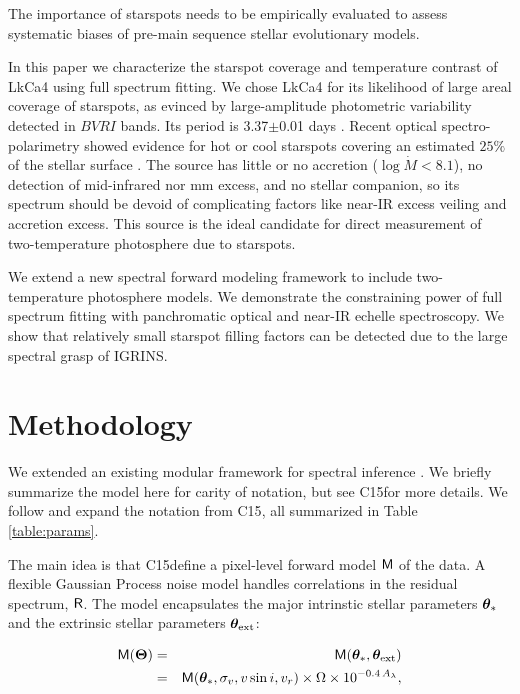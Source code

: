 \documentclass[onecolumn]{emulateapj}%
\newcommand{\iancze}{{\sc C15}}
\newcommand{\name}{LkCa4 }
\begin{document}
The importance of starspots needs to be empirically evaluated to assess systematic biases of pre-main sequence stellar evolutionary models.

In this paper we characterize the starspot coverage and temperature contrast of \name using full spectrum fitting.  We chose \name for its likelihood of large areal coverage of starspots, as evinced by large-amplitude photometric variability  detected in $BVRI$ bands.  Its period is 3.37$\pm$0.01 days \citep{1993AJ....106.1608V,1994IBVS.4042....1G}.  Recent optical spectro-polarimetry showed evidence for hot or cool starspots covering an estimated $25\%$ of the stellar surface \citep{2014MNRAS.444.3220D}.  The source has little or no accretion ($\log{\dot M} < 8.1$), no detection of mid-infrared nor mm excess, and no stellar companion, so its spectrum should be devoid of complicating factors like near-IR excess veiling and accretion excess.  This source is the ideal candidate for direct measurement of two-temperature photosphere due to starspots.

We extend a new spectral forward modeling framework to include two-temperature photosphere models.  We demonstrate the constraining power of full spectrum fitting with panchromatic optical and near-IR echelle spectroscopy.  We show that relatively small starspot filling factors can be detected due to the large spectral grasp of IGRINS.  

\section{Methodology}\label{sec:methods} 
We extended an existing modular framework for spectral inference \citep[][hereafter \iancze]{2015ApJ...812..128C}.  We briefly summarize the model here for carity of notation, but see \iancze for more details.  We follow and expand the notation from \iancze, all summarized in Table \ref{table:params}. 

The main idea is that \iancze define a pixel-level forward model $\mathsf{M}$ of the data.  A flexible Gaussian Process noise model handles correlations in the residual spectrum, $\mathsf{R}$.  The model encapsulates the major intrinstic stellar parameters ${\bm \theta}_{\ast}$ and the extrinsic stellar parameters ${\bm \theta}_{\rm ext}$:

\begin{eqnarray} \label{eqn:scaling}
\mathsf{M}({\bm \Theta}) &=& \mathsf{M}({\bm \theta}_{\ast}, {\bm \theta}_{\rm ext}) \\
         &=& \mathsf{M}({\bm \theta}_{\ast}, \sigma_v, v\sin{i}, v_r) \times \Omega \times 10^{-0.4\,A_{\lambda}}, \nonumber
\end{eqnarray}
\end{document}

